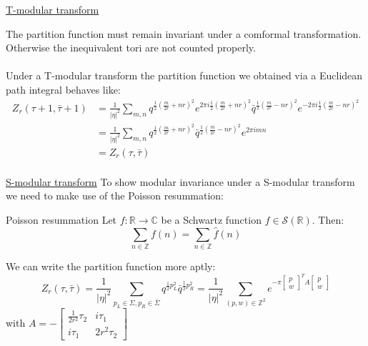 \documentclass[11pt,aspectratio=169]{beamer}
\begin{document}
\begin{frame}{\underline{T-modular transform}}

	The partition function must remain invariant under a comformal transformation. Otherwise the inequivalent tori are not counted properly. 
	\\~\\
	Under a T-modular transform the partition function we obtained via a Euclidean path integral behaves like:
	\begin{align*}
		Z_r (\tau + 1, \bar{\tau} + 1) &= \frac{1}{|\eta|^2} \sum_{m, n} q^{\frac{1}{2}(\frac{m}{2r} + nr)^2}e^{2\pi i \frac{1}{2}(\frac{m}{2r} + nr)^2}
		\bar{q}^{\frac{1}{2}(\frac{m}{2r} - nr)^2}e^{-2\pi i \frac{1}{2}(\frac{m}{2r} - nr)^2} \\
		&= \frac{1}{|\eta|^2} \sum_{m, n} q^{\frac{1}{2}(\frac{m}{2r} + nr)^2}\bar{q}^{\frac{1}{2}(\frac{m}{2r} - nr)^2}e^{2 \pi i mn} \\
		&= Z_r (\tau, \bar{\tau}) \\
	\end{align*}

	
\end{frame}

\begin{frame}{\underline{S-modular transform}}
	To show modular invariance under a S-modular transform we need to make use of the Poisson resummation:
	\begin{block}{Poisson resummation}
		Let $f: \mathbb{R} \rightarrow \mathbb{C}$ be a Schwartz function $f \in \mathcal{S}(\mathbb{R})$.
		Then:
		\begin{equation}
			\sum_{n\in\mathbb{Z}} f(n) = \sum_{n\in\mathbb{Z}} \hat{f}(n)
		\end{equation}
	\end{block}
	We can write the partition function more aptly:
	\begin{equation}
		Z_r (\tau, \bar{\tau}) = \frac{1}{|\eta|^2} \sum_{p_L\in\Sigma, p_R\in\bar{\Sigma}} q^{\frac{1}{2}p_L^2}\bar{q}^{\frac{1}{2}p_R^2} = \frac{1}{|\eta|^2}\sum_{(p, w)\in\mathbb{Z}^2}e^{-\pi\begin{bmatrix} p \\ w \end{bmatrix}^T A \begin{bmatrix} p \\ w \end{bmatrix}}
	\end{equation}
	with $A = -\begin{bmatrix} \frac{1}{2r^2}\tau_2 & i \tau_1 \\ i \tau_1 & 2r^2 \tau_2 \end{bmatrix}$
\end{frame}
\end{document}
